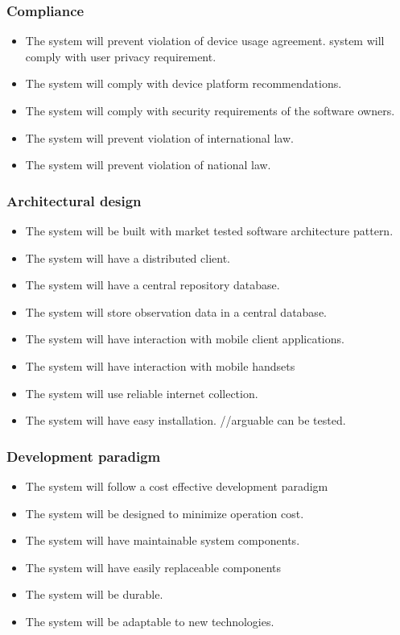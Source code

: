 \subsubsection{Compliance}
		\begin{itemize}
		     \item The system will prevent violation of device usage agreement.
             \itemThe system will comply with user privacy requirement.
             \item The system will comply with device platform recommendations.
             \item The system will comply with security requirements of the software owners.
             \item The system will prevent violation of international law.
             \item The system will prevent violation of national law.

	    \end{itemize}
\subsubsection{Architectural design}
    \begin{itemize}
        \item The system will be built with market tested software architecture pattern.
        \item The system will have a distributed client.
        \item The system will have a central repository database.
        \item The system will store observation data in a central database.
        \item The system will have interaction with mobile client applications.
        \item The system will have interaction with mobile handsets
        \item The system will use reliable internet collection.
        \item The system will have easy installation. //arguable can be tested.

    \end{itemize}
\subsubsection{Development paradigm}
    \begin{itemize}
        \item The system will follow a cost effective development paradigm
        \item The system will be designed to minimize operation cost.
        \item The system will have maintainable system components.
        \item The system will have easily replaceable components
        \item The system will be durable.
        \item The system will be adaptable to new technologies.

    \end{itemize}
